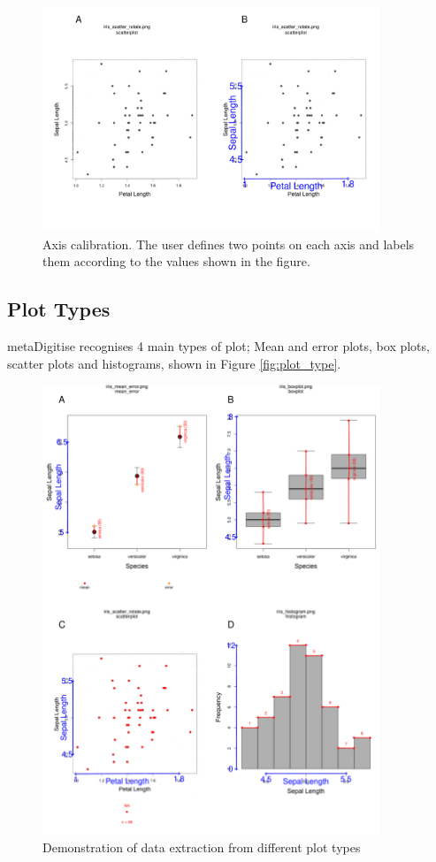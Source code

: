 \documentclass{article}
\begin{document}
\begin{figure}[!h] 
 \includegraphics[width=0.9\textwidth]{fig_calibrate.pdf} 
 \caption{Axis calibration. The user defines two points on each axis and labels them according to the values shown in the figure.}
\label{fig:calibrate}
\end{figure}

\subsection{Plot Types}
metaDigitise recognises 4 main types of plot; Mean and error plots, box plots, scatter plots and histograms, shown in Figure \ref{fig:plot_type}. 

\begin{figure}[!h] 
 \includegraphics[width=0.9\textwidth]{fig_all_extract.pdf} 
 \caption{Demonstration of data extraction from different plot types}
\label{fig:all_extract}
\end{figure}
\end{document}
